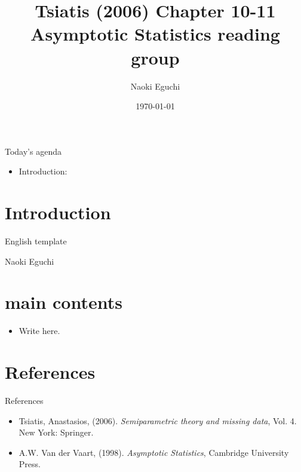 \documentclass[xcolor=dvipsnames,aspectratio=169]{beamer}
\begin{document}
 

\title{Tsiatis (2006) Chapter 10-11\\ \small{Asymptotic Statistics reading group}}
\author{Naoki Eguchi}          
\date{\today}

\begin{frame}                  
    \titlepage                     
\end{frame}

\begin{frame}{Today's agenda}                  
    \begin{itemize}
        \item Introduction: 
    \end{itemize}
\end{frame}

\section{Introduction}

\begin{frame}{English template}
    \begin{definition}[name]
        Naoki Eguchi
    \end{definition}
\end{frame}

\section{main contents}

\begin{frame}
    \begin{itemize}
        \item Write here.
    \end{itemize}
\end{frame}

\section*{References}

\begin{frame}{References}
    \begin{itemize}
        \item Tsiatis, Anastasios, (2006).
        \textit{Semiparametric theory and missing data}, Vol. 4. New York: Springer.
        \item A.W. Van der Vaart, (1998). 
        \textit{Asymptotic Statistics}, Cambridge University Press.
    \end{itemize}
\end{frame}
\end{document}
